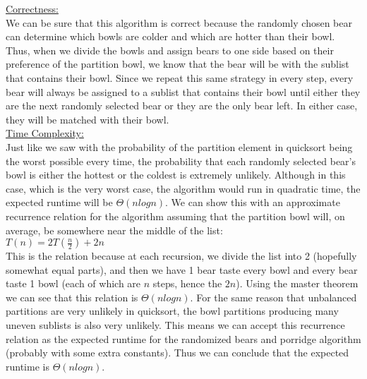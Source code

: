 \documentclass[10pt]{article}
\begin{document}
\begin{enumerate}
{    \underline{Correctness:} \\ We can be sure that this algorithm is correct because the randomly chosen bear can determine which bowls are colder and which are hotter than their bowl. Thus, when we divide the bowls and assign bears to one side based on their preference of the partition bowl, we know that the  bear will be with the sublist that contains their bowl. Since we repeat this same strategy in every step, every bear will always be assigned to a sublist that contains their bowl until either they are the next randomly selected bear or they are the only bear left. In either case, they will be matched with their bowl. \\
    \underline{Time Complexity:} \\
    Just like we saw with the probability of the partition element in quicksort being the worst possible every time, the probability that each randomly selected bear's bowl is either the hottest or the coldest is extremely unlikely. Although in this case, which is the very worst case, the algorithm would run in quadratic time, the expected runtime will be $\Theta(nlog n)$. We can show this with an approximate recurrence relation for the algorithm assuming that the partition bowl will, on average, be somewhere near the middle of the list: \\
    $T(n) = 2T(\frac{n}{2}) + 2n$ \\
    This is the relation because at each recursion, we divide the list into 2 (hopefully somewhat equal parts), and then we have 1 bear taste every bowl and every bear taste 1 bowl (each of which are $n$ steps, hence the $2n$). Using the master theorem we can see that this relation is $\Theta(nlog n)$. For the same reason that unbalanced partitions are very unlikely in quicksort, the bowl partitions producing many uneven sublists is also very unlikely. This means we can accept this recurrence relation as the expected runtime for the randomized bears and porridge algorithm (probably with some extra constants). Thus we can conclude that the expected runtime is $\Theta(nlog n)$.
    }
\end{enumerate}
\end{document}
